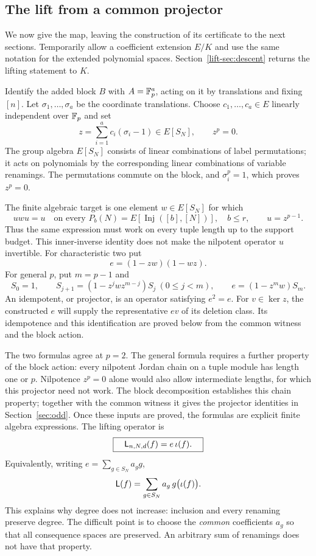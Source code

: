 \documentclass[11pt,a4paper]{article}
\theoremstyle{definition}\newtheorem{definition}[theorem]{Definition}
\theoremstyle{remark}\newtheorem{remark}[theorem]{Remark}
\DeclareMathOperator{\Inj}{Inj}
\begin{document}
\subsection{The lift from a common projector}\label{lift-sec:formula}
We now give the map, leaving the construction of its certificate to the
next sections. Temporarily allow a coefficient extension $E/K$ and use
the same notation for the extended polynomial spaces. Section~\ref{lift-sec:descent}
returns the lifting statement to $K$.

Identify the added block $B$ with $A=\mathbb F_p^a$, acting on it by translations
and fixing $[n]$. Let $\sigma_1,\ldots,\sigma_a$ be the coordinate
translations. Choose $c_1,\ldots,c_a\in E$ linearly independent over
$\mathbb F_p$ and set
\[
 z=\sum_{i=1}^a c_i(\sigma_i-1)\in E[S_N],\qquad z^p=0.
\]
The group algebra $E[S_N]$ consists of linear combinations of label
permutations; it acts on polynomials by the corresponding linear
combinations of variable renamings. The permutations commute on the
block, and $\sigma_i^p=1$, which proves $z^p=0$.

The finite algebraic target is one element $w\in E[S_N]$ for which
\begin{equation}\label{lift-eq:witness}
 u w u=u\quad\text{on every }P_b(N)=E[\Inj([b],[N])],\quad b\le r,
 \qquad u=z^{p-1}.
\end{equation}
Thus the same expression must work on every tuple length up to the
support budget. This inner-inverse identity does not make the
nilpotent operator $u$ invertible. For characteristic two put
\[
                         e=(1-zw)(1-wz).
\]
For general $p$, put $m=p-1$ and
\begin{equation}\label{lift-eq:projector}
 S_0=1,\qquad S_{j+1}=(1-z^jwz^{m-j})S_j\ (0\le j<m),
 \qquad e=(1-z^mw)S_m.
\end{equation}
An idempotent, or projector, is an operator satisfying $e^2=e$.
For $v\in\ker z$, the constructed $e$ will supply the representative
$ev$ of its deletion class. Its idempotence and this identification
are proved below from the common witness and the block action.

The two formulas agree at $p=2$. The general formula requires a further
property of the block action: every nilpotent Jordan chain on a tuple
module has length one or $p$. Nilpotence $z^p=0$ alone would also allow
intermediate lengths, for which this projector need not work. The
block decomposition establishes this chain property; together with
the common witness it gives the projector identities in
Section~\ref{sec:odd}. Once these inputs are
proved, the formulas are explicit finite algebra expressions. The lifting operator is
\begin{equation}\label{lift-eq:actual-lift}
 \boxed{\quad\mathsf L_{n,N,d}(f)=e\,\iota(f).\quad}
\end{equation}
Equivalently, writing $e=\sum_{g\in S_N}a_g g$,
\[
                    \mathsf L(f)=\sum_{g\in S_N}a_g\,g\bigl(\iota(f)\bigr).
\]
This explains why degree does not increase: inclusion and every
renaming preserve degree. The difficult point is to choose the
\emph{common} coefficients $a_g$ so that all consequence spaces are
preserved. An arbitrary sum of renamings does not have that property.
\end{document}
